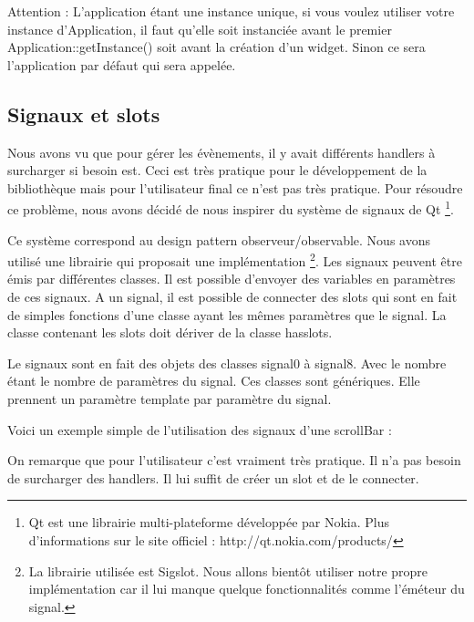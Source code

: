 Attention : L'application étant une instance unique, si vous voulez utiliser votre instance d'Application, il faut qu'elle soit instanciée avant le premier Application::getInstance() soit avant la création d'un widget.
Sinon ce sera l'application par défaut qui sera appelée.

\subsection{Signaux et slots}

Nous avons vu que pour gérer les évènements, il y avait différents handlers à surcharger si besoin est.
Ceci est très pratique pour le développement de la bibliothèque mais pour l'utilisateur final ce n'est pas très pratique.
Pour résoudre ce problème, nous avons décidé de nous inspirer du système de signaux de Qt
\footnote{Qt est une librairie multi-plateforme développée par Nokia. Plus d'informations sur le site officiel : http://qt.nokia.com/products/}.

Ce système correspond au design pattern observeur/observable.
Nous avons utilisé une librairie qui proposait une implémentation
\footnote{La librairie utilisée est Sigslot. Nous allons bientôt utiliser notre propre implémentation car il lui manque quelque fonctionnalités comme l'éméteur du signal.}.
Les signaux peuvent être émis par différentes classes.
Il est possible d'envoyer des variables en paramètres de ces signaux.
A un signal, il est possible de connecter des slots qui sont en fait de simples fonctions d'une classe ayant les mêmes paramètres que le signal.
La classe contenant les slots doit dériver de la classe hasslots.

Le signaux sont en fait des objets des classes signal0 à signal8. Avec le nombre étant le nombre de paramètres du signal.
Ces classes sont génériques.
Elle prennent un paramètre template par paramètre du signal.

Voici un exemple simple de l'utilisation des signaux d'une scrollBar :



On remarque que pour l'utilisateur c'est vraiment très pratique. Il n'a pas besoin de surcharger des handlers.
Il lui suffit de créer un slot et de le connecter.